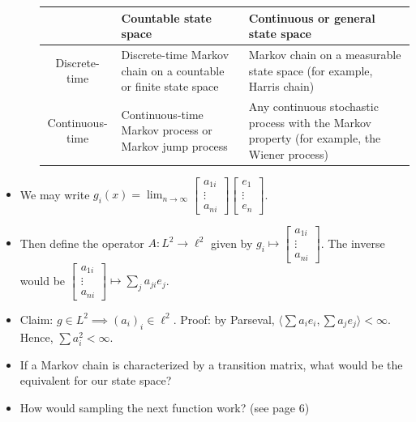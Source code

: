 \documentclass{article}
\begin{document}
\begin{itemize}
\begin{itemize}
\begin{tabularx}{\textwidth}{|c|X|X|}
\hline
 & Countable state space & Continuous or general state space \\
\hline
Discrete-time 
& Discrete-time Markov chain on a countable or finite state space 
& Markov chain on a measurable state space (for example, Harris chain) \\
\hline
Continuous-time 
& Continuous-time Markov process or Markov jump process 
& Any continuous stochastic process with the Markov property (for example, the Wiener process) \\
\hline
\end{tabularx}
    \end{itemize}
    \item We may write $\displaystyle g_i(x) = \lim_{n \to \infty}\begin{bmatrix}
            a_{1i} \\ \vdots \\ a_{ni}  \end{bmatrix}\begin{bmatrix}
            e_{1} \\ \vdots \\ e_{n}  \end{bmatrix}$.
    \item Then define the operator $A: L^2 \to \ell^2$ given by $g_i \mapsto \begin{bmatrix}
            a_{1i} \\ \vdots \\ a_{ni}  \end{bmatrix}$. The inverse would be $\begin{bmatrix}  a_{1i} \\ \vdots \\ a_{ni}  \end{bmatrix} \mapsto \sum_j a_{ji}e_j$.
    \item Claim: $g \in L^2 \implies (a_i)_i \in \ell^2$. Proof: by Parseval, $\langle \sum a_ie_i, \sum a_j e_j \rangle < \infty$. Hence, $\sum a_i^2 < \infty$.
    \item If a Markov chain is characterized by a transition matrix, what would be the equivalent for our state space?
    \item How would sampling the next function work? (see page 6)
\end{itemize}
\end{document}

